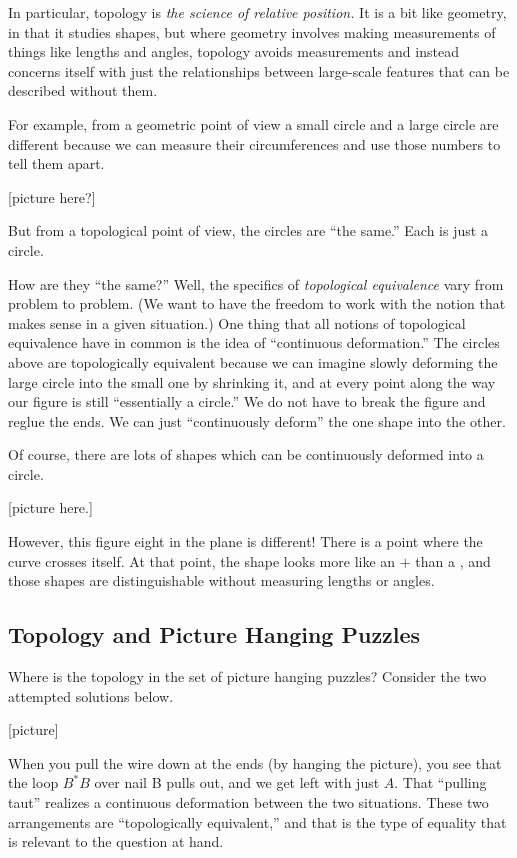 \documentclass[12pt,letterpaper]{article}
\theoremstyle{definition}
\begin{document}
In particular, topology is \emph{the science of relative position.}
It is a bit like geometry, in that it studies shapes, but where geometry involves making measurements of things like lengths and angles, topology avoids measurements and instead concerns itself with just the relationships between large-scale features that can be described without them.

For example, from a geometric point of view a small circle and a large circle are different because we can measure their circumferences and use those numbers to tell them apart.

[picture here?]

But from a topological point of view, the circles are ``the same.''
Each is just a circle.

How are they ``the same?''
Well, the specifics of \emph{topological equivalence} vary from problem to problem.
(We want to have the freedom to work with the notion that makes sense in a given situation.)
One thing that all notions of topological equivalence have in common is the idea of ``continuous deformation.''
The circles above are topologically equivalent because we can imagine slowly deforming the large circle into the small one by shrinking it, and at every point along the way our figure is still ``essentially a circle.''
We do not have to break the figure and reglue the ends.
We can just ``continuously deform'' the one shape into the other.

Of course, there are lots of shapes which can be continuously deformed into a circle.

[picture here.]

However, this figure eight in the plane is different!
There is a point where the curve crosses itself.
At that point, the shape looks more like an $+$ than a \textbar, and those shapes are distinguishable without measuring lengths or angles.


\subsection*{Topology and Picture Hanging Puzzles}

Where is the topology in the set of picture hanging puzzles?
Consider the two attempted solutions below.

[picture]

When you pull the wire down at the ends (by hanging the picture), you see that the loop $B^*B$ over nail B pulls out, and we get left with just $A$.
That ``pulling taut'' realizes a continuous deformation between the two situations.
These two arrangements are ``topologically equivalent,'' and that is the type of equality that is relevant to the question at hand.
\end{document}
